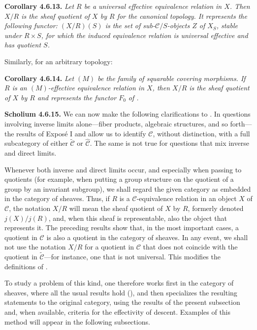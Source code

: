 \medskip
\noindent{}\textbf{Corollary 4.6.13.}
\textit{Let \(R\) be a universal effective equivalence relation in
\(X\). Then \(X/R\) is the sheaf quotient
of \(X\) by \(R\) for the canonical topology. It represents the
following functor: \((X/R)(S)\) is the set of
sub-\(\mathscr C/S\)-objects \(Z\) of \(X_S\), stable under
\(R\times S\), for which the induced equivalence relation is universal
effective and has quotient \(S\).}

Similarly, for an arbitrary topology:

\medskip
\noindent{}\textbf{Corollary 4.6.14.}
\textit{Let \((M)\) be the family of squarable covering morphisms. If
\(R\) is an \((M)\)-effective equivalence relation in \(X\), then
\(X/R\) is the sheaf quotient of \(X\) by \(R\) and represents the
functor \(F_0\) of .}

\medskip
\noindent{}\textbf{Scholium 4.6.15.}
We can now make the following clarifications to . In questions
involving inverse limits alone---fiber products, algebraic structures,
and so forth---the results of Expos\'e I and  allow us to identify
\(\mathscr C\), without distinction, with a full subcategory of either
\(\widetilde{\mathscr C}\) or \(\widehat{\mathscr C}\). The same is not
true for questions that mix inverse and direct limits.

Whenever both inverse and direct limits occur, and especially when
passing to quotients (for example, when putting a group structure on the
quotient of a group by an invariant subgroup), we shall regard the given
category as embedded in the category of sheaves. Thus, if \(R\) is a
\(\mathscr C\)-equivalence relation in an object \(X\) of
\(\mathscr C\), the notation \(X/R\) will mean the sheaf quotient of
\(X\) by \(R\), formerly denoted \(j(X)/j(R)\), and, when this sheaf is
representable, also the object that represents it. The preceding results
show that, in the most important cases, a quotient in \(\mathscr C\) is
also a quotient in the category of sheaves. In any event, we shall not
use the notation \(X/R\) for a quotient in \(\mathscr C\) that does not
coincide with the quotient in \(\widetilde{\mathscr C}\)---for instance,
one that is not universal. This modifies the definitions of .

To study a problem of this kind, one therefore works first in the
category of sheaves, where all the usual results hold (), and
then specializes the resulting statements to the original category,
using the results of the present subsection and, when available,
criteria for the effectivity of descent. Examples of this method will
appear in the following subsections.
